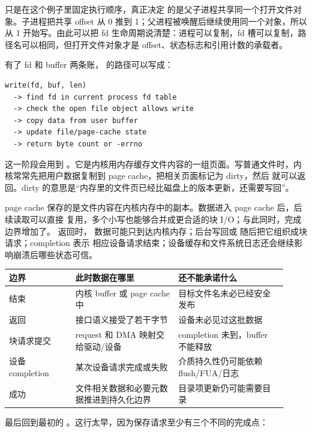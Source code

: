  只是在这个例子里固定执行顺序，真正决定  的是父子进程共享同一个打开文件对象。子进程把共享 offset 从 0 推到 1；父进程被唤醒后继续使用同一个对象，所以从 1 开始写。由此可以把 fd 生命周期说清楚：进程可以复制，fd 槽可以复制，路径名可以相同，但打开文件对象才是 offset、状态标志和引用计数的承载者。

有了 fd 和 buffer 两条账， 的路径可以写成：

\begin{lstlisting}
write(fd, buf, len)
  -> find fd in current process fd table
  -> check the open file object allows write
  -> copy data from user buffer
  -> update file/page-cache state
  -> return byte count or -errno
\end{lstlisting}

这一阶段会用到 。它是内核用内存缓存文件内容的一组页面。写普通文件时，内核常常先把用户数据复制到 page cache，把相关页面标记为 dirty，然后  就可以返回。dirty 的意思是“内存里的文件页已经比磁盘上的版本更新，还需要写回”。

page cache 保存的是文件内容在内核内存中的副本。数据进入 page cache 后，后续读取可以直接
复用，多个小写也能够合并成更合适的块 I/O；与此同时，完成边界增加了。 返回时，
数据可能只到达内核内存；后台写回或  随后把它组织成块请求；completion 表示
相应设备请求结束；设备缓存和文件系统日志还会继续影响崩溃后哪些状态可信。

\begin{longtable}{|L{0.22\linewidth}|L{0.34\linewidth}|L{0.36\linewidth}|}
\toprule
边界 & 此时数据在哪里 & 还不能承诺什么 \\
\midrule
{} 结束 & 内核 buffer 或 page cache 中 & 目标文件名未必已经安全发布 \\\tablerowrule
{} 返回 & 接口语义接受了若干字节 & 设备未必见过这批数据 \\\tablerowrule
块请求提交 & request 和 DMA 映射交给驱动/设备 & completion 未到，buffer 不能释放 \\\tablerowrule
设备 completion & 某次设备请求完成或失败 & 介质持久性仍可能依赖 flush/FUA/日志 \\\tablerowrule
{} 成功 & 文件相关数据和必要元数据推进到持久化边界 & 目录项更新仍可能需要目录  \\
\bottomrule
\end{longtable}

最后回到最初的 。这行太早，因为保存请求至少有三个不同的完成点：

